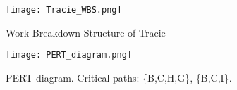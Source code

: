 \documentclass[11pt, letterpaper]{article}
\begin{document}
	\begin{figure}[!ht] 
		\centering		%
		\hspace*{-1cm}	%
		\texttt{[image: Tracie\_WBS.png]} %
		\caption{Work Breakdown Structure of Tracie}
		\label{fig:WBS}
	\end{figure}
	
	\begin{figure}[!ht]
		\centering
		\hspace*{-1cm}	%
		\texttt{[image: PERT\_diagram.png]} %
		\caption{PERT diagram. Critical paths: \{B,C,H,G\}, \{B,C,I\}.}
		\label{fig:PERT}
	\end{figure}
\end{document}
